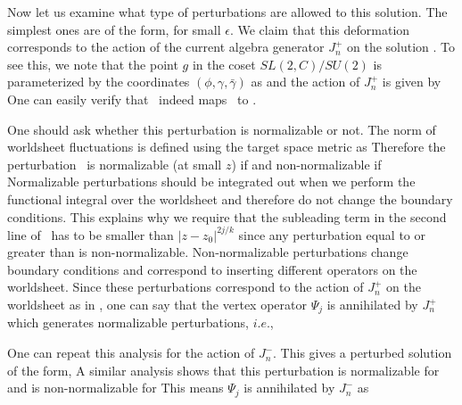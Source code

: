 Now let us examine what type of perturbations are allowed to
this solution. The simplest ones are of the form,
\eqn{}
for small $\epsilon$.
We claim that this deformation corresponds
to the action of the current algebra generator $J_n^+$
on the solution \simplest. To see this, we note that
the point $g$ in the coset $SL(2,C)/SU(2)$ is parameterized
by the coordinates $(\phi, \gamma, \bar{\gamma})$ as
\eqn{}
and the action of $J_n^+$ is given by
\eqn{}
One can easily verify that \jnaction\
indeed maps \simplest\ to \perturb.

One should ask whether this
perturbation is normalizable or not.
The norm of worldsheet fluctuations
is defined using the target space metric as
\eqn{}
Therefore the perturbation \perturb\ is normalizable
(at small $z$) if
\eqn{}
and non-normalizable if
\eqn{}
Normalizable perturbations should be integrated out
when we perform the functional integral over
the worldsheet and therefore do not change
the boundary conditions. This explains why
we require that the subleading term in the
second line of \wsbc\ has to be smaller than
$|z-z_0|^{2j/k}$ since any perturbation equal to or
greater than is non-normalizable.
Non-normalizable perturbations change boundary
conditions and correspond to inserting different
operators on the worldsheet. Since these perturbations
correspond to the action of $J_n^+$ on the worldsheet
as in \jnaction, one can say that the vertex operator
$\Psi_j$ is annihilated by $J_n^+$ which generates
normalizable perturbations, $i.e.$,
\eqn{}

One can repeat this analysis for the action of $J_n^-$.
This gives a perturbed solution of the form,
\eqn{}
A similar analysis shows that this perturbation is
normalizable for
\eqn{}
and is non-normalizable for
\eqn{}
This means $\Psi_j$ is annihilated by $J_n^-$ as
\eqn{}


